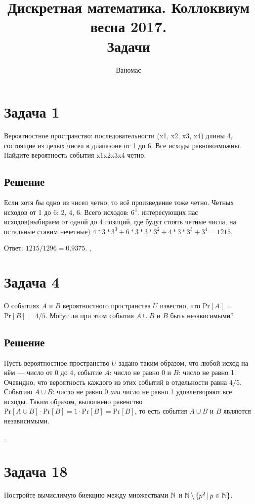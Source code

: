\documentclass[a4paper,12pt]{article}
\newcommand {\gu} [1] {\guillemotleft#1\guillemotright}
\renewcommand{\Pr} {\text {Pr}}
\begin{document}
	\title{Дискретная математика. Коллоквиум весна 2017. \\ Задачи}
	\author{Ваномас}
	\maketitle
\section*{Задача 1}
    
    Вероятностное пространство: последовательности (x1, x2, x3, x4) длины 4, состоящие из целых чисел в диапазоне от 1 до 6. Все исходы равновозможны. Найдите вероятность события x1x2x3x4 четно.
    
    \subsection*{Решение}
    
    Если хотя бы одно из чисел четно, то всё произведение тоже четно. Четных исходов от 1 до 6: 2, 4, 6. Всего исходов: $6^4$. интересующих нас исходов(выбираем от одной до 4 позиций, где будут стоять четные числа, на остальные ставим нечетные) $4 * 3 * 3^3 + 6 * 3 * 3 * 3^2 + 4 * 3 * 3^3 + 3^4 = 1215. $
    
    Ответ: $1215/1296 = 0.9375$.
    \sep
	\section*{Задача 4}
	О событиях $A$ и $B$ вероятностного пространства $U$ известно, что $\Pr [A]$ = $\Pr [B] = 4/5$. Могут ли при этом события $A\cup B$ и $B$ быть независимыми?
	
	\subsection*{Решение}
	Пусть вероятностное пространство $U$ задано таким образом, что любой исход на нём --- число от $0$ до $4$, событие $A$: \gu{число не равно 0} и $B$: \gu{число не равно 1}. Очевидно, что вероятность каждого из этих событий в отдельности равна $4/5$. Событию $A\cup B$: \gu{число не равно 0 \textit{или} число не равно 1} удовлетворяют все исходы. Таким образом, выполнено равенство $\Pr [A\cup B]\cdot\Pr [B]=1\cdot\Pr [B] = \Pr[B]$, то есть события $A\cup B$ и $B$ являются независимыми.
	
	\sep
	\section*{Задача 18}
	Постройте вычислимую биекцию между множествами $\mathbb{N}$ и $\mathbb{N}\,\backslash\,\{p^2\,|\,p\in\mathbb{N}\}$.
\end{document}
